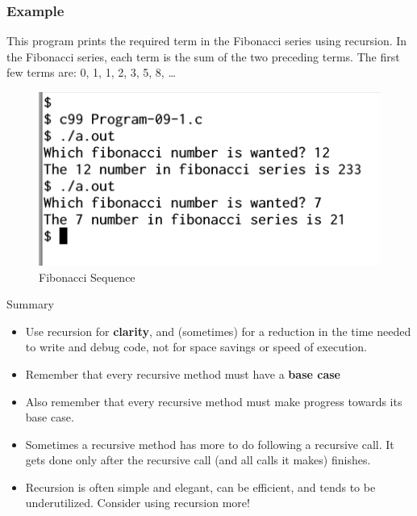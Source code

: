 \documentclass[11pt,a4paper]{article}
\begin{document}
\subsubsection*{Example}
This program prints the required term in the Fibonacci series using recursion. In the Fibonacci series, each term is the sum of the two preceding terms. The first few terms are: 0, 1, 1, 2, 3, 5, 8, \ldots



\begin{figure}[ht]
\begin{center}
\includegraphics[scale=0.6]{Output-09-1.png}
\caption{Fibonacci Sequence}
\label{output-09-1}
\end{center}
\end{figure}

\begin{bclogo}[couleur=blue!5, arrondi=0.3, logo=\bctrombone]{Summary}
\begin{itemize}
\item Use recursion for \textbf{clarity}, and (sometimes) for a reduction in the time needed to write and debug code, not for space savings or speed of execution.
\item Remember that every recursive method must have  a \textbf{base case}
\item Also remember that every recursive method must make progress towards its base case.
\item Sometimes a recursive method has more to do following  a recursive call. It gets done only after the recursive call (and all calls it makes) finishes.
\item Recursion is often simple and elegant, can be efficient, and tends to be underutilized. Consider using recursion more!
\end{itemize}
\end{bclogo}
\end{document}
